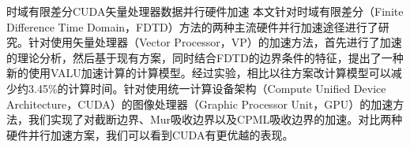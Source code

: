 
\begin{Cabstract}{时域有限差分}{CUDA}{矢量处理器}{数据并行}{硬件加速}
本文针对时域有限差分（Finite Difference Time Domain，FDTD）方法的两种主流硬件并行加速途径进行了研究。针对使用矢量处理器（Vector Processor，VP）的加速方法，首先进行了加速的理论分析，然后基于现有方案，同时结合FDTD的边界条件的特征，提出了一种新的使用VALU加速计算的计算模型。经过实验，相比以往方案改计算模型可以减少约3.45\%的计算时间。针对使用统一计算设备架构（Compute Unified Device Architecture，CUDA）的图像处理器（Graphic Processor Unit，GPU）的加速方法，我们实现了对截断边界、Mur吸收边界以及CPML吸收边界的加速。对比两种硬件并行加速方案，我们可以看到CUDA有更优越的表现。
\end{Cabstract}
